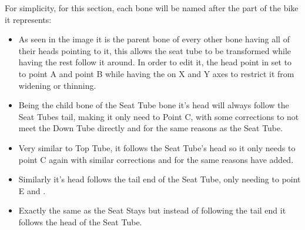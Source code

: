 \documentclass[letterpaper,10pt,english]{jupyterBook}
\begin{document}
\sphinxAtStartPar
{} For simplicity, for this section, each bone will be named after the part of the bike it represents:
\begin{itemize}
\item {} 
\sphinxAtStartPar
{} As seen in the image it is the parent bone of every other bone having all of their heads pointing to it, this allows the seat tube to be transformed while having the rest follow it around. In order to edit it, the head point in set to  to point A and  point B while having the  on X and Y axes to restrict it from widening or thinning.

\item {} 
\sphinxAtStartPar
{} Being the child bone of the Seat Tube bone it’s head will always follow the Seat Tubes tail, making it only need to  Point C, with some corrections to not meet the Down Tube directly and  for the same reasons as the Seat Tube.

\item {} 
\sphinxAtStartPar
{} Very similar to Top Tube, it follows the Seat Tube’s head so it only needs to  point C again with similar corrections and for the same reasons have  added.

\item {} 
\sphinxAtStartPar
{} Similarly it’s head follows the tail end of the Seat Tube, only needing to  point E and .

\item {} 
\sphinxAtStartPar
{} Exactly the same as the Seat Stays but instead of following the tail end it follows the head of the Seat Tube.

\end{itemize}
\end{document}
